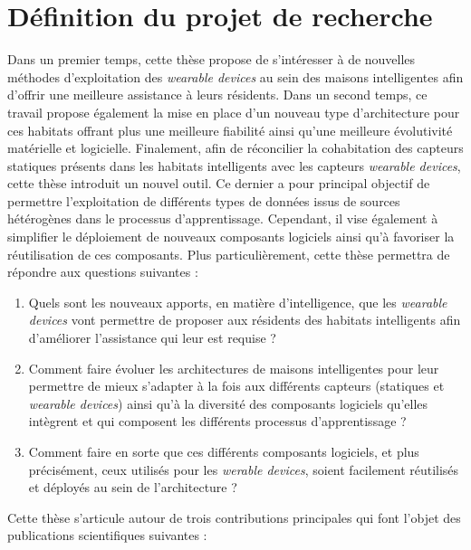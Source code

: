 {{\section{Définition du projet de recherche}
\label{sec:def_proj}

Dans un premier temps, cette thèse propose de s'intéresser à de nouvelles méthodes d'exploitation des \textit{wearable devices} au sein des maisons intelligentes afin d'offrir une meilleure assistance à leurs résidents. Dans un second temps, ce travail propose également la mise en place d'un nouveau type d'architecture pour ces habitats offrant plus une meilleure fiabilité ainsi qu'une meilleure évolutivité matérielle et logicielle. Finalement, afin de réconcilier la cohabitation des capteurs statiques présents dans les habitats intelligents avec les capteurs \textit{wearable devices}, cette thèse introduit un nouvel outil. Ce dernier a pour principal objectif de permettre l'exploitation de différents types de données issus de sources hétérogènes dans le processus d'apprentissage. Cependant, il vise également à simplifier le déploiement de nouveaux composants logiciels ainsi qu'à favoriser la réutilisation de ces composants. Plus particulièrement, cette thèse permettra de répondre aux questions suivantes :

\begin{enumerate}
	\item
		\label{question:1}
		Quels sont les nouveaux apports, en matière d'intelligence, que les \textit{wearable devices} vont permettre de proposer aux résidents des habitats intelligents afin d'améliorer l'assistance qui leur est requise ?
	\item
		\label{question:2}
		Comment faire évoluer les architectures de maisons intelligentes pour leur permettre de mieux s'adapter à la fois aux différents capteurs (statiques et \textit{wearable devices}) ainsi qu'à la diversité des composants logiciels qu'elles intègrent et qui composent les différents processus d'apprentissage ?
	\item
		\label{question:3}
		Comment faire en sorte que ces différents composants logiciels, et plus précisément, ceux utilisés pour les \textit{werable devices}, soient facilement réutilisés et déployés au sein de l'architecture ?
\end{enumerate}

Cette thèse s'articule autour de trois contributions principales qui font l'objet des publications scientifiques suivantes :

}}
